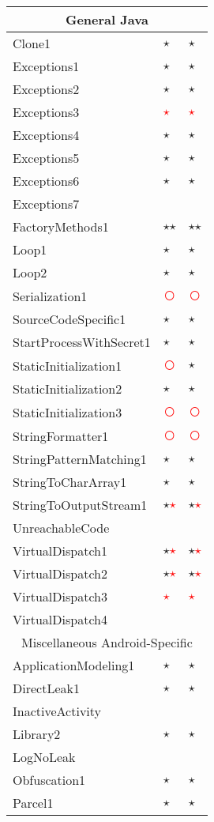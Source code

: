 \documentclass[../draft.tex]{subfiles}
\newcommand{\fp}{\textcolor{white}{\textcircled{\textcolor{red}{$\star$}}}}
\newcommand{\fn}{\textcolor{red}{\textcircled{ }}}
\newcommand{\tp}[0]{\textcircled{$\star$}}
\newcommand{\tsub}[1]{\multicolumn{3}{c}{#1}\\\hline}
\begin{document}
\begin{longtable}{l | l | l}
        \hline
        \tsub{General Java}
        Clone1 & \tp & \tp\\
        Exceptions1 & \tp & \tp \\
        Exceptions2 & \tp & \tp\\
        Exceptions3 & \fp & \fp \\
        Exceptions4 & \tp & \tp \\
        Exceptions5 & \tp & \tp \\
        Exceptions6 & \tp & \tp\\
        Exceptions7 & &\\
        FactoryMethods1 & \tp \tp & \tp \tp\\
        Loop1 & \tp & \tp\\
        Loop2 & \tp & \tp\\
        Serialization1 & \fn & \fn\\
        SourceCodeSpecific1 & \tp & \tp\\
        StartProcessWithSecret1 & \tp & \tp\\
        StaticInitialization1 & \fn & \tp\\
        StaticInitialization2 & \tp & \tp\\
        StaticInitialization3 & \fn & \fn\\
        StringFormatter1 & \fn & \fn\\
        StringPatternMatching1 & \tp & \tp\\
        StringToCharArray1 & \tp & \tp\\
        StringToOutputStream1 & \tp \fp & \tp \fp\\
        UnreachableCode & &\\
        VirtualDispatch1 & \tp \fp & \tp \fp\\
        VirtualDispatch2 & \tp \fp & \tp \fp\\
        VirtualDispatch3 & \fp & \fp\\
        VirtualDispatch4 & &\\
        \hline
        \tsub{Miscellaneous Android-Specific}
        ApplicationModeling1 & \tp & \tp\\
        DirectLeak1 & \tp & \tp\\
        InactiveActivity &  & \\
        Library2 & \tp & \tp\\
        LogNoLeak & & \\
        Obfuscation1 & \tp & \tp\\
        Parcel1 & \tp & \tp\\

\end{longtable}
\end{document}
